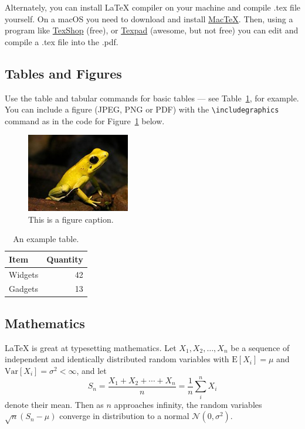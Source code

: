 \documentclass[12pt]{article}
\begin{document}
Alternately, you can install LaTeX compiler on your machine and compile .tex file yourself.  On a macOS you need to download and install \href{http://www.tug.org/mactex/downloading.html}{MacTeX}.  Then, using a program like \href{http://pages.uoregon.edu/koch/texshop/}{TexShop} (free), or \href{https://www.texpad.com/}{Texpad} (awesome, but not free) you can edit and compile a .tex file into the .pdf.


\subsection{Tables and Figures}

Use the table and tabular commands for basic tables --- see Table~\ref{tab:widgets}, for example. You can include a figure (JPEG, PNG or PDF) with the \verb$\includegraphics$ command as in the code for Figure~\ref{fig:frog} below.

\begin{figure}
\centering
\includegraphics[width=0.4\textwidth]{figures/frog.jpg}
\caption{\label{fig:frog}This is a figure caption.}
\end{figure}

\begin{table}
\centering
\begin{tabular}{l|r}
Item & Quantity \\\hline
Widgets & 42 \\
Gadgets & 13
\end{tabular}
\caption{\label{tab:widgets}An example table.}
\end{table}

\subsection{Mathematics}

\LaTeX{} is great at typesetting mathematics. Let $X_1, X_2, \ldots, X_n$ be a sequence of independent and identically distributed random variables with $\text{E}[X_i] = \mu$ and $\text{Var}[X_i] = \sigma^2 < \infty$, and let
$$S_n = \frac{X_1 + X_2 + \cdots + X_n}{n}
      = \frac{1}{n}\sum_{i}^{n} X_i$$
denote their mean. Then as $n$ approaches infinity, the random variables $\sqrt{n}(S_n - \mu)$ converge in distribution to a normal $\mathcal{N}(0, \sigma^2)$.
\end{document}

